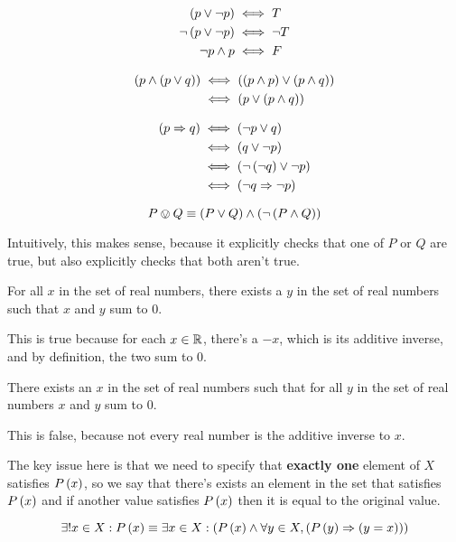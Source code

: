 \documentclass{article}
\begin{document}

\begin{align*}
  \left (p \lor \lnot p \right) & \iff T \\
  \lnot \left (p \lor \lnot p \right) & \iff \lnot T \\
  \lnot p \land p & \iff F \\
\end{align*}


\begin{align*}
  \left (p \land \left (p \lor q \right) \right) & \iff \left (\left (p \land p \right) \lor \left (p \land q \right) \right) \\
                                 & \iff \left (p \lor \left (p \land q \right) \right)
\end{align*}


\begin{align*}
  \left (p \Rightarrow q \right) & \iff \left (\lnot p \lor q \right) \\
                         & \iff \left (q \lor \lnot p \right) \\
                         & \iff \left (\lnot \left (\lnot q \right) \lor \lnot p  \right) \\
                         & \iff \left (\lnot q \Rightarrow \lnot p \right) \\
\end{align*}


\problem

$$
P \ovee Q \equiv \left (P \lor Q \right) \land \left (\lnot \left (P \land Q \right) \right)
$$

Intuitively, this makes sense, because it explicitly checks that one of $P$ or $Q$ are true, but also explicitly checks that both aren't true.

\problem

\subproblema

For all $x$ in the set of real numbers, there exists a $y$ in the set of real numbers such that $x$ and $y$ sum to $0$.

This is true because for each $x \in \mathbb R$, there's a $-x$, which is its additive inverse, and by definition, the two sum to 0.

\subproblema

There exists an $x$ in the set of real numbers such that for all $y$ in the set of real numbers $x$ and $y$ sum to $0$.

This is false, because not every real number is the additive inverse to $x$.

\problem

The key issue here is that we need to specify that \textbf{exactly one} element of $X$ satisfies $P\left (x \right)$, so we say that there's exists an element in the set that satisfies $P\left (x \right)$ and if another value satisfies $P\left (x \right)$ then it is equal to the original value.

$$
\exists ! x \in X : P\left (x \right) \equiv \exists x \in X : \left (P\left (x \right) \land \forall y \in X, \left (P\left (y \right) \Rightarrow \left (y=x \right) \right) \right)
$$
\end{document}

